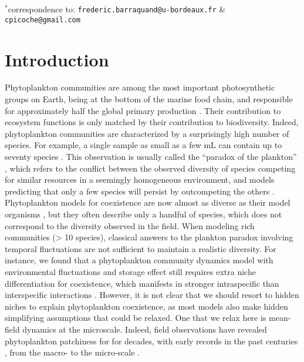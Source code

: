 \documentclass[12pt,english]{article}
\begin{document}
$^{*}$correspondence to: \verb|frederic.barraquand@u-bordeaux.fr|
\& \verb|cpicoche@gmail.com|

\clearpage{}

\section*{Introduction}

Phytoplankton communities are among the most important photosynthetic
groups on Earth, being at the bottom of the marine food chain, and
responsible for approximately half the global primary production \citep{field_primary_1998}.
Their contribution to ecosystem functions is only matched by their
contribution to biodiversity. Indeed, phytoplankton communities are
characterized by a surprisingly high number of species. For example,
a single sample as small as a few mL can contain up to seventy species
\citep{REPHY_db,widdicombe_2021}. This observation is usually called
the ``paradox of the plankton'' \citep[a term coined by][]{hutchinson_paradox_1961}, which refers to the conflict between the observed diversity of species competing for similar resources in a seemingly homogeneous environment, and models predicting that only a few species will persist by outcompeting the others \citep{macarthur_competition_1964,huisman_biodiversity_1999,schippers_does_2001}.
Phytoplankton models for coexistence are now almost as diverse as
their model organisms \citep{record_paradox_2014}, but they often
describe only a handful of species, which does not correspond to the
diversity observed in the field. When modeling rich communities (\textgreater{}
10 species), classical answers to the plankton paradox involving temporal
fluctuations \citep[e.g.,][]{li_effects_2016,chesson_updates_2018}
are not sufficient to maintain a realistic diversity. For instance,
we found that a phytoplankton community dynamics model with environmental
fluctuations and storage effect still requires extra niche differentiation
for coexistence, which manifests in stronger intraspecific than interspecific
interactions \citep{picoche_how_2019}. However, it is not clear that
we should resort to hidden niches to explain phytoplankton coexistence,
as most models also make hidden simplifying assumptions that could
be relaxed. One that we relax here is mean-field dynamics at the microscale.
Indeed, field observations have revealed phytoplankton patchiness
for for decades, with early records in the past centuries \citep{bainbridge_size_1957,stocker_marine_2012},
from the macro- to the micro-scale \citep{leonard_interannual_2001,doubell_high-resolution_2006,font-munoz_advection_2017}.
\end{document}

